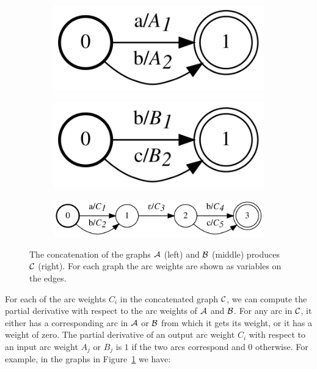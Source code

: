 \begin{figure}
    \centering
    \begin{subfigure}[b]{0.23\textwidth}
        \centering
        \includegraphics[scale=0.6]{figures/concat_grad_A}
    \end{subfigure}
    \begin{subfigure}[b]{0.23\textwidth}
        \centering
        \includegraphics[scale=0.6]{figures/concat_grad_B}
    \end{subfigure}
    \begin{subfigure}[b]{.52\textwidth}
        \centering
        \includegraphics[scale=0.6]{figures/concat_grad_C}
    \end{subfigure}
    \caption{The concatenation of the graphs $\mathcal{A}$ (left) and $\mathcal{B}$ (middle)
    produces $\mathcal{C}$ (right). For each graph the arc weights are shown as
    variables on the edges.}
    \label{fig:concat_grad}
\end{figure}

For each of the arc weights $C_i$ in the concatenated graph $\mathcal{C}$, we can
compute the partial derivative with respect to the arc weights of $\mathcal{A}$ and
$\mathcal{B}$. For any arc in $\mathcal{C}$, it either has a corresponding arc in $\mathcal{A}$ or
$\mathcal{B}$ from which it gets its weight, or it has a weight of zero. The partial
derivative of an output arc weight $C_i$ with respect to an input arc weight
$A_j$ or $B_j$ is $1$ if the two arcs correspond and $0$ otherwise. For
example, in the graphs in Figure~\ref{fig:concat_grad} we have:

